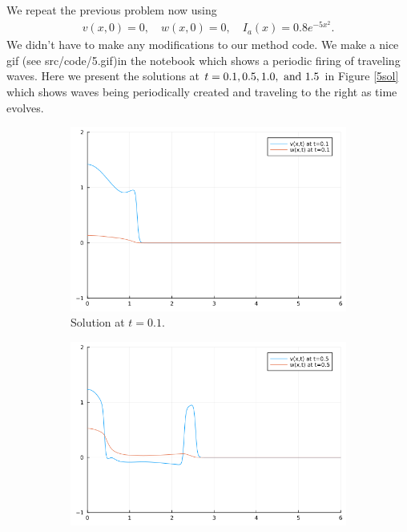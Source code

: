 \documentclass[12pt]{report}
\begin{document}
\begin{solution}

    \noindent
    We repeat the previous problem now using
    \begin{align*}
        v(x,0) = 0, \quad w(x,0) = 0, \quad I_a(x) = 0.8 e^{-5x^2}.
    \end{align*}
    We didn't have to make any modifications to our method code. We make a nice gif (see src/code/5.gif)in the notebook which shows a periodic firing of traveling waves. Here we present the solutions at $t=0.1,0.5,1.0,{~\text{and}~} 1.5$ in Figure \ref{5sol} which shows waves being periodically created and traveling to the right as time evolves.
    \begin{figure}[H]
        \begin{subfigure}[b]{0.45\linewidth}
            \centering
            \includegraphics[width=\linewidth]{images/5-1.png}
            \caption{Solution at $t=0.1$.}
            \label{5sol:a}
            \vspace{4ex}
        \end{subfigure}%
        \begin{subfigure}[b]{0.45\linewidth}
            \centering
            \includegraphics[width=\linewidth]{images/5-2.png}

\end{subfigure}
\end{figure}
\end{solution}
\end{document}

